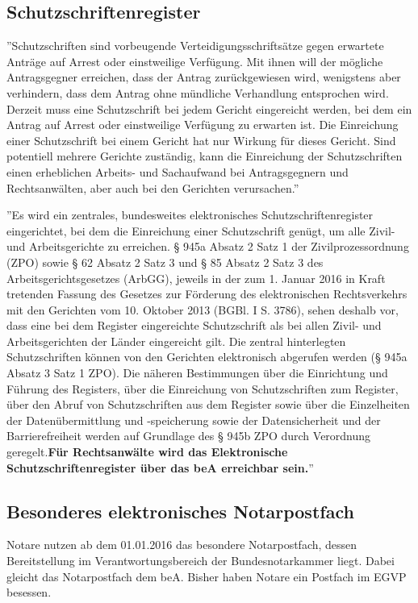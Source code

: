 \subsection{Schutzschriftenregister}
''Schutzschriften sind vorbeugende Verteidigungsschriftsätze gegen erwartete Anträge auf Arrest oder einstweilige Verfügung. Mit ihnen will der mögliche Antragsgegner erreichen, dass der Antrag zurückgewiesen wird, wenigstens aber verhindern, dass dem Antrag ohne mündliche Verhandlung entsprochen wird. Derzeit muss eine Schutzschrift bei jedem Gericht eingereicht werden, bei dem ein Antrag auf Arrest oder einstweilige Verfügung zu erwarten ist. Die Einreichung einer Schutzschrift bei einem Gericht hat nur Wirkung für dieses Gericht. Sind potentiell mehrere Gerichte zuständig, kann die Einreichung der Schutzschriften einen erheblichen Arbeits- und Sachaufwand bei Antragsgegnern und Rechtsanwälten, aber auch bei den Gerichten verursachen.'' \textcite{bea:schutzschriftenregister}

''Es wird ein zentrales, bundesweites elektronisches Schutzschriftenregister eingerichtet, bei dem die Einreichung einer Schutzschrift genügt, um alle Zivil- und Arbeitsgerichte zu erreichen. § 945a Absatz 2 Satz 1 der Zivilprozessordnung (ZPO) sowie § 62 Absatz 2 Satz 3 und § 85 Absatz 2 Satz 3 des Arbeitsgerichtsgesetzes (ArbGG), jeweils in der zum 1. Januar 2016 in Kraft tretenden Fassung des Gesetzes zur Förderung des elektronischen Rechtsverkehrs mit den Gerichten vom 10. Oktober 2013 (BGBl. I S. 3786), sehen deshalb vor, dass eine bei dem Register eingereichte Schutzschrift als bei allen Zivil- und Arbeitsgerichten der Länder eingereicht gilt. Die zentral hinterlegten Schutzschriften können von den Gerichten elektronisch abgerufen werden (§ 945a Absatz 3 Satz 1 ZPO). Die näheren Bestimmungen über die Einrichtung und Führung des Registers, über die Einreichung von Schutzschriften zum Register, über den Abruf von Schutzschriften aus dem Register sowie über die Einzelheiten der Datenübermittlung und -speicherung sowie der Datensicherheit und der Barrierefreiheit werden auf Grundlage des § 945b ZPO durch Verordnung geregelt.\textbf{Für Rechtsanwälte wird das Elektronische Schutzschriftenregister über das beA erreichbar sein.}'' \textcite{bea:bea:brak-schutzschriften}

\subsection{Besonderes elektronisches Notarpostfach}
Notare nutzen ab dem 01.01.2016 das besondere Notarpostfach, dessen Bereitstellung im Verantwortungsbereich der Bundesnotarkammer liegt. Dabei gleicht das Notarpostfach dem beA. Bisher haben Notare ein Postfach im EGVP besessen.